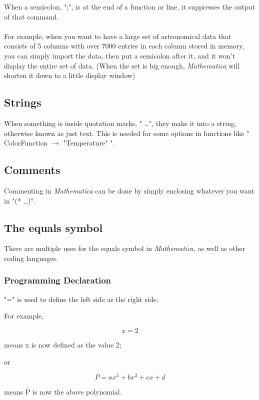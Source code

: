 \documentclass[11pt,a4paper,twoside]{article}
\begin{document}
				When a semicolon, ";", is at the end of a function or line, it suppresses the output of that command.
				\\
				\\
				For example, when you want to have a large set of astronomical data that consists of 5 columns with over 7000 entries in each column stored in memory, you can simply import the data, then put a semicolon after it, and it won't display the entire set of data. (When the set is big enough, \textit{Mathematica} will shorten it down to a little display window)

			\subsection{Strings}
				
				When something is inside quotation marks, " \dots ", they make it into a string, otherwise known as just text.  This is needed for some options in functions like " ColorFunction $\rightarrow$ "Temperature" ".

			\subsection{Comments}
			
				Commenting in \textit{Mathematica} can be done by simply enclosing whatever you want in "(* \dots *)".

			\subsection{The equals symbol}
				
				There are multiple uses for the equals symbol in \textit{Mathematica}, as well as other coding languages.  
				
					\subsubsection{Programming Declaration} %
					
						"=" is used to define the left side as the right side.
					
						For example, 
					
						\[ x = 2 \]
					
						means x is now defined as the value 2;
					
						or
					
						\[ P = ax^3 + bx^2 + cx + d \]
					
						means P is now the above polynomial.
						
\end{document}
